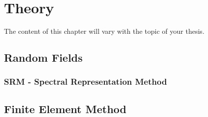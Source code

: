\chapter[Theory]{Theory}
The content of this chapter will vary with the topic of your thesis. 

\section{Random Fields}

\subsection{SRM - Spectral Representation Method}

\section{Finite Element Method}





